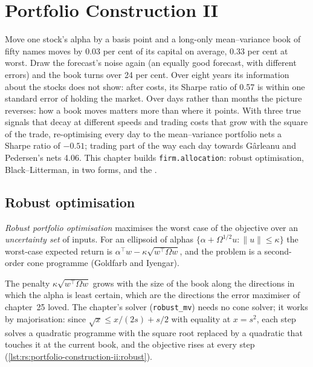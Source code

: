 \chapter{Portfolio Construction II}\label{ch:rs:portfolio-construction-ii}

Move one stock's alpha by a basis point and a long-only mean--variance book of fifty names moves by 0.03 per cent of its capital on average, 0.33 per cent at
worst. Draw the forecast's noise again (an equally good forecast, with different errors) and the book turns over 24 per cent. Over eight years its
information about the stocks does not show: after costs, its Sharpe ratio of 0.57 is within one standard error of holding the market. Over days rather
than months the picture reverses: how a book moves matters more than where it points. With three true signals that decay at different speeds and trading
costs that grow with the square of the trade, re-optimising every day to the mean--variance portfolio nets a Sharpe ratio of $-0.51$; trading part of the way
each day towards Gârleanu and Pedersen's  nets 4.06. This chapter builds \texttt{firm.allocation}: robust optimisation, Black--Litterman,
 in two forms, and the .

\section{Robust optimisation}

\begin{definition}\label{def:rs:portfolio-construction-ii:robust}
\emph{Robust portfolio optimisation} maximises the worst case of the objective over an \emph{uncertainty
set} of inputs. For an ellipsoid of alphas $\{\alpha + \Omega^{1/2}u : \lVert u\rVert \le \kappa\}$ the worst-case expected return is
$\alpha^\top w - \kappa\sqrt{w^\top\Omega w}$, and the problem is a second-order cone programme (Goldfarb and Iyengar).
\end{definition}

The penalty $\kappa\sqrt{w^\top\Omega w}$ grows with the size of the book along the directions in which the alpha is least certain, which are the directions
the error maximiser of chapter~25 loved. The chapter's solver (\texttt{robust\_mv}) needs no cone solver; it works by majorisation: since $\sqrt x \le x/(2s) + s/2$
with equality at $x = s^2$, each step solves a quadratic programme with the square root replaced by a quadratic that touches it at the current book, and the
objective rises at every step (\cref{lst:rs:portfolio-construction-ii:robust}).

